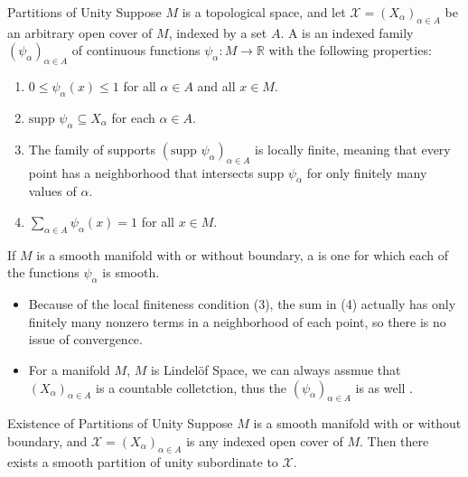 \documentclass[../main.tex]{subfiles}
\begin{document}
\begin{definition}{Partitions of Unity}{}
    Suppose $M$ is a topological space, and let $\mathcal{X} = (X_\alpha)_{\alpha \in A}$ be an arbitrary open cover of $M$, indexed by a set $A$. A  is an indexed family $(\psi_\alpha)_{\alpha \in A}$ of continuous functions $\psi_\alpha: M \to \mathbb{R}$ with the following properties:
\begin{enumerate}
\item $0 \le \psi_\alpha(x) \le 1$ for all $\alpha \in A$ and all $x \in M$.
\item $\text{supp } \psi_\alpha \subseteq X_\alpha$ for each $\alpha \in A$.
\item The family of supports $(\text{supp } \psi_\alpha)_{\alpha \in A}$ is locally finite, meaning that every point has a neighborhood that intersects $\text{supp } \psi_\alpha$ for only finitely many values of $\alpha$.
\item $\sum_{\alpha \in A} \psi_\alpha(x) = 1$ for all $x \in M$.
\end{enumerate}

If $M$ is a smooth manifold with or without boundary, a  is one for which each of the functions $\psi_\alpha$ is smooth.
\end{definition}

\begin{remark}
    \begin{itemize}
    \item 
Because of the local finiteness condition (3), the sum in (4) actually has only finitely many nonzero terms in a neighborhood of each point, so there is no issue of convergence. 
\item For a manifold \(  M  \),   \(  M  \) is Lindel\"of Space, we can always assmue that \(  \left( X_{\alpha } \right) _{\alpha \in A}  \) is a countable colletction, thus the \(  \left( \psi _{\alpha } \right)_{\alpha \in A}   \) is as well .  
    \end{itemize}
    
\end{remark}

\begin{theorem}{Existence of Partitions of Unity}{}
Suppose $M$ is a smooth manifold with or without boundary, and $\mathcal{X} = (X_{\alpha})_{\alpha \in A}$ is any indexed open cover of $M$. Then there exists a smooth partition of unity subordinate to $\mathcal{X}$.
\end{theorem}
\end{document}
